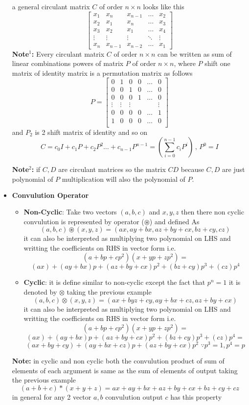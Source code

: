 \documentclass[a4paper]{article}
\numberwithin{equation}{section}
\begin{document}
\begin{itemize}
a general circulant matrix $C$ of order $n \times n$ looks like this
\[\begin{bmatrix}
    x_1&x_n&x_{n-1}&\dots&x_2\\
    x_2&x_1&x_{n}&\dots&x_3\\
    x_3&x_2&x_{1}&\dots&x_4\\
    \vdots&\vdots&\vdots&\ddots&\vdots\\
    x_n&x_{n-1}&x_{n-2}&\dots&x_1
\end{bmatrix}\]
\textbf{Note$^1$:} Every circulant matrix $C$ of order $n\times n$ can be written as sum of linear combinations powers of matrix $P$ of order $n\times n$, where $P$ shift one matrix of identity matrix is a permutation matrix as follows
\[P=\begin{bmatrix}
    0&1&0&0&\dots&0\\
    0&0&1&0&\dots&0\\
    0&0&0&1&\dots&0\\
    \vdots&\vdots&\vdots&&&\vdots\\
    0&0&0&0&\dots&1\\
    1&0&0&0&\dots&0\\
\end{bmatrix}\]
and $P_2$ is 2 shift matrix of identity and so on
\[C=c_0I+c_1P+c_2P^2\dots+c_{n-1}P^{n-1}=\left(\sum_{i=0}^{n-1}c_{i}P^{i}\right) \hspace{2pt},\hspace{2pt} P^0=I\]

\textbf{Note$^2$:} if $C,D$ are circulant matrices so the matrix $CD$ because $C,D$ are just polynomial of $P$ multiplication will also the polynomial of $P$.
\item \textbf{Convulution Operator}
\begin{itemize}
    \item \textbf{Non-Cyclic}: Take two vectors $(a,b,c)$ and $x,y,z$ then there non cyclic convulution is represented by operator ($\circledast$) and defined As
    \[(a,b,c)\circledast (x,y,z)=(ax,ay+bx,az+by+cx,bz+cy,cz)\]
    it can also be interpreted as multiplying two polynomial on LHS and writting the coefficients on RHS in vector form i.e.
    \[(a+bp+cp^2)(x+yp+zp^2)=\]
    \[(ax)+(ay+bx)p+(az+by+cx)p^2+(bz+cy)p^3+(cz)p^4\]

    \item \textbf{Cyclic}: it is define similar to non-cyclic except the fact that $p^n=1$ it is denoted by $\otimes$ taking the previous example
    \[(a,b,c)\otimes  (x,y,z)=(ax+byz+cy,ay+bx+cz,az+by+cx)\]
    it can also be interpreted as multiplying two polynomial on LHS and writting the coefficients on RHS in vector form i.e.
    \[(a+bp+cp^2)(x+yp+zp^2)=\]
    \[(ax)+(ay+bx)p+(az+by+cx)p^2+(bz+cy)p^3+(cz)p^4=\]
    \[(ax+by+cy)+(ay+bx+cz)p+(az+by+cx)p^2  \hspace{4pt}\because p^3=1,p^4=p\]
\end{itemize}
\pagebreak
\textbf{Note:} in cyclic and non cyclic both the convulution product of sum of elements of each argument is same as the sum of elements of output taking the previous example
\[(a+b+c)*(x+y+z)=ax+ay+bx+az+by+cx+bz+cy+cz\]
in general for any 2 vector $a,b$ convulution output $c$ has this property


\end{itemize}
\end{document}
